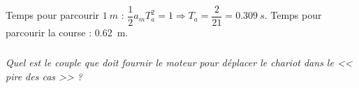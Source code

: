 \documentclass[10pt,fleqn]{article} %
\begin{document}
\begin{multicols}{2}
\begin{multicols}{2}
\begin{corrige}
Temps pour parcourir $\SI{1}{m}$ : $\dfrac{1}{2}a_mT_a^2 =1 \Rightarrow T_a = \dfrac{2}{21}=\SI{0,309}{s}$. Temps pour parcourir la course : \SI{0,62}{m}.
\end{corrige}
\else
\fi


\subparagraph{}
\textit{Quel est le couple que doit fournir le moteur pour déplacer le chariot dans le << pire des cas >> ?}
\ifprof
\begin{corrige}
\end{corrige}
\else
\fi



\ifprof
\end{multicols}
\else
\end{multicols}
\fi
\end{document}
